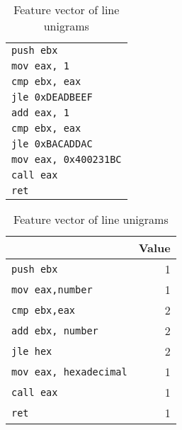 \begin{table}[!htb]
\begin{minipage}{.5\linewidth}
	\centering
	
	\caption{Assembly code of function f}
	\label{tab:function_f}
	
	\medskip
	
	\begin{tabular}{ l } 
		\toprule
		\texttt{push ebx} \\
		\texttt{mov eax, 1}\\
		\texttt{cmp ebx, eax}\\
		\texttt{jle 0xDEADBEEF}\\
		\texttt{add eax, 1}\\
		\texttt{cmp ebx, eax}\\
		\texttt{jle 0xBACADDAC}\\
		\texttt{mov eax, 0x400231BC}\\
		\texttt{call eax}\\
		\texttt{ret}\\
	
		
		\bottomrule
	\end{tabular}
\end{minipage}\hfill
\begin{minipage}{.5\linewidth}
	\centering
	
	\caption{Feature vector of line unigrams}
	\label{tab:line_unigrams}
	
	\medskip
	
	\begin{tabular}{  lr } 
		\toprule
		\makecell{ Feature }  &  Value \\   
		
		\midrule 
		\texttt{push ebx} & 1         \\
		\texttt{mov eax,number} & 1                  \\ 
		\texttt{cmp ebx,eax }   & 2                  \\ 
		\texttt{add ebx, number}     & 2                  \\ 
		\texttt{jle hex }       & 2                  \\
		\texttt{mov eax, hexadecimal} & 1\\ 
		\texttt{call eax}       & 1                  \\
		\texttt{ret} & 1\\
		\bottomrule
	\end{tabular}
\end{minipage}
\end{table}


